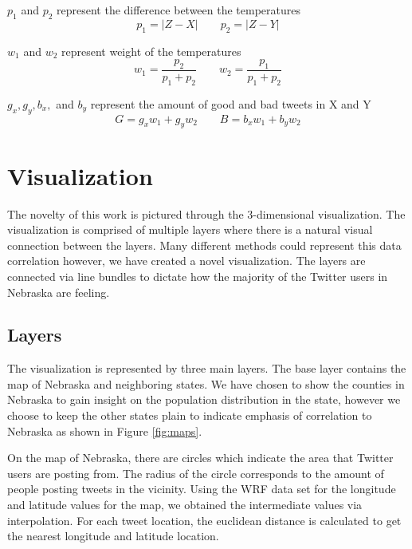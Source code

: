 \documentclass[journal]{vgtc}                %
\begin{document}
$p_1$ and $p_2$ represent the difference between the temperatures
\begin{equation} \label{eq:p} p_{1}=\left | Z-X \right |	\qquad p_{2}=\left | Z-Y \right |	 \end{equation}

$w_1$ and $w_2$ represent weight of the temperatures
\begin{equation} \label{eq:w} w_{1}=\frac{p_{2}}{p_{1}+p_{2}} 	\qquad w_{2}=\frac{p_{1}}{p_{1}+p_{2}}   \end{equation}

$g_x, g_y, b_x,$ and $b_y$ represent the amount of good and bad tweets in X and Y
\begin{equation} \label{eq:gb}  G = g_{x}w_{1} + g_{y}w_{2}	\qquad B = b_{x}w_{1} + b_{y}w_{2}	 \end{equation}



\section{Visualization}
The novelty of this work is pictured through the 3-dimensional visualization. The visualization is comprised of multiple layers where there is a natural visual connection between the layers. Many different methods could represent this data correlation however, we have created a novel visualization. The layers are connected via line bundles to dictate how the majority of the Twitter users in Nebraska are feeling.

\subsection{Layers}
The visualization is represented by three main layers. The base layer contains the map of Nebraska and neighboring states. We have chosen to show the counties in Nebraska to gain insight on the population distribution in the state, however we choose to keep the other states plain to indicate emphasis of correlation to Nebraska as shown in Figure \ref{fig:maps}.

On the map of Nebraska, there are circles which indicate the area that Twitter users are posting from. The radius of the circle corresponds to the amount of people posting tweets in the vicinity. Using the WRF data set for the longitude and latitude values for the map, we obtained the intermediate values via interpolation. For each tweet location, the euclidean distance is calculated to get the nearest longitude and latitude location.
\end{document}
